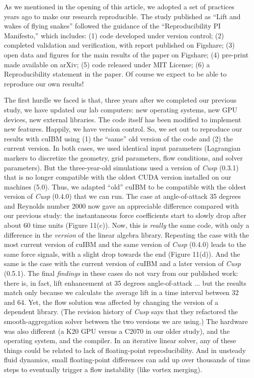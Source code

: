 \documentclass[9pt,twocolumn,twoside]{article}
\newlength{\up}
\begin{document}
As we mentioned in the opening of this article, we adopted a set of practices years ago to make our research reproducible. 
The study published as ``Lift and wakes of flying snakes'' followed the guidance of the ``Reproducibility PI Manifesto,'' 
which includes: 
(1) code developed under version control; 
(2) completed validation and verification, with report published on Figshare; 
(3) open data and figures for the main results of the paper on Figshare; 
(4) pre-print made available on arXiv; 
(5) code released under MIT License; 
(6) a Reproducibility statement in the paper.
Of course we expect to be able to reproduce our own results!

The first hurdle we faced is that, three years after we completed our previous study, we have updated our lab computers: 
new operating systems, new GPU devices, new external libraries. 
The code itself has been modified to implement new features. 
Happily, we have version control.
So, we set out to reproduce our results with cuIBM using (1) the ``same''  old version of the code and (2) the current version. 
In both cases, we used identical input parameters (Lagrangian markers to discretize the geometry, grid parameters, flow conditions, and solver parameters). 
But the three-year-old simulations used a version of \textsl{Cusp} (0.3.1) that is no longer compatible with the oldest CUDA version installed on our machines (5.0). 
Thus, we adapted ``old'' cuIBM to be compatible with the oldest version of \textsl{Cusp} (0.4.0) that we can run. 
The case at angle-of-attack 35 degrees and Reynolds number 2000 now gave an appreciable difference compared with our previous study: 
the instantaneous force coefficients start to slowly drop after about 60 time units (Figure 11(c)). 
Now, this is \textit{really} the same code, with only a difference in the \textit{version} of the linear algebra library. 
Repeating the case with the most current version of cuIBM and the same version of \textsl{Cusp} (0.4.0) leads to the same force signals, with a slight drop towards the end (Figure 11(d)). 
And the same is the case with the current version of cuIBM and a later version of \textsl{Cusp} (0.5.1). 
The final \textit{findings} in these cases do not vary from our published work: there is, in fact, lift enhancement at 35 degrees angle-of-attack ... but the results match only because we calculate the average lift in a time interval between 32 and 64. 
Yet, the flow solution was affected by changing the version of a dependent library. 
(The revision history of \textsl{Cusp} says that they refactored the smooth-aggregation solver between the two versions we are using.) 
The hardware was also different (a K20 GPU versus a C2070 in our older study), and the operating system, and the compiler. 
In an iterative linear solver, any of these things could be related to lack of floating-point reproducibility. 
And in unsteady fluid dynamics, small floating-point differences can add up over thousands of time steps to eventually trigger a flow instability (like vortex merging).
\end{document}
